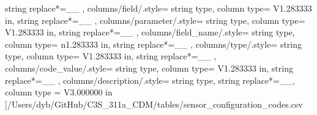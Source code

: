 \begin{landscape}
{            string replace*={_}{\_}
        },
    columns/field/.style={
            string type, 
            column type= V{1.283333 in}, 
            string replace*={_}{\_}
        },
    columns/parameter/.style={
            string type, 
            column type= V{1.283333 in}, 
            string replace*={_}{\_}
        },
    columns/field_name/.style={
            string type, 
            column type= n{1.283333 in}, 
            string replace*={_}{\_}
        },
    columns/type/.style={
            string type, 
            column type= V{1.283333 in}, 
            string replace*={_}{\_}
        },
    columns/code_value/.style={
            string type, 
            column type= V{1.283333 in}, 
            string replace*={_}{\_}
        },
    columns/description/.style={
            string type, 
            string replace*={_}{\_},
            column type = V{3.000000 in}
        }
    ]{/Users/dyb/GitHub/C3S_311a_CDM/tables/sensor_configuration_codes.csv}
\end{landscape}
